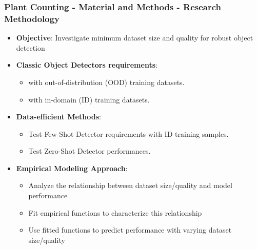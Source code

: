 \documentclass[aspectratio=43]{beamer}
\begin{document}
\begin{frame}
    \frametitle{Plant Counting - Material and Methods - Research Methodology}
    \small
    \begin{itemize}
        \item \textbf{Objective}: Investigate minimum dataset size and quality for robust object detection
        \item \textbf{Classic Object Detectors requirements}:
            \begin{itemize}
                \item with out-of-distribution (OOD) training datasets.
                \item with in-domain (ID) training datasets.
            \end{itemize} 
        \item \textbf{Data-efficient Methods}: 
            \begin{itemize}
                \item Test Few-Shot Detector requirements with ID training samples.
                \item Test Zero-Shot Detector performances.
            \end{itemize}
        \item \textbf{Empirical Modeling Approach}:
            \begin{itemize}
                \item Analyze the relationship between dataset size/quality and model performance
                \item Fit empirical functions to characterize this relationship
                \item Use fitted functions to predict performance with varying dataset size/quality
            \end{itemize}
    \end{itemize}
\end{frame}
\end{document}

